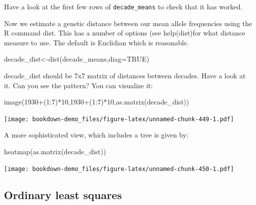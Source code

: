 \documentclass[
]{book}
\newenvironment{Shaded}{\begin{snugshade}}{\end{snugshade}}
\newcommand{\AttributeTok}[1]{\textcolor[rgb]{0.77,0.63,0.00}{#1}}
\newcommand{\ConstantTok}[1]{\textcolor[rgb]{0.00,0.00,0.00}{#1}}
\newcommand{\DecValTok}[1]{\textcolor[rgb]{0.00,0.00,0.81}{#1}}
\newcommand{\FunctionTok}[1]{\textcolor[rgb]{0.00,0.00,0.00}{#1}}
\newcommand{\NormalTok}[1]{#1}
\newcommand{\OtherTok}[1]{\textcolor[rgb]{0.56,0.35,0.01}{#1}}
\newcommand{\SpecialCharTok}[1]{\textcolor[rgb]{0.00,0.00,0.00}{#1}}
\begin{document}
Have a look at the first few rows of \texttt{decade\_means} to check that it has worked.

Now we estimate a genetic distance between our mean allele frequencies using the R command dist. This has a number of options (see help(dist)for what distance measure to use. The default is Euclidian which is reasonable.

\begin{Shaded}
\begin{Highlighting}[]
\NormalTok{decade\_dist}\OtherTok{\textless{}{-}}\FunctionTok{dist}\NormalTok{(decade\_means,}\AttributeTok{diag=}\ConstantTok{TRUE}\NormalTok{)}
\end{Highlighting}
\end{Shaded}

decade\_dist should be 7x7 matrix of distances between decades. Have a look at it. Can you
see the pattern? You can visualize it:

\begin{Shaded}
\begin{Highlighting}[]
\FunctionTok{image}\NormalTok{(}\DecValTok{1930}\SpecialCharTok{+}\NormalTok{(}\DecValTok{1}\SpecialCharTok{:}\DecValTok{7}\NormalTok{)}\SpecialCharTok{*}\DecValTok{10}\NormalTok{,}\DecValTok{1930}\SpecialCharTok{+}\NormalTok{(}\DecValTok{1}\SpecialCharTok{:}\DecValTok{7}\NormalTok{)}\SpecialCharTok{*}\DecValTok{10}\NormalTok{,}\FunctionTok{as.matrix}\NormalTok{(decade\_dist))}
\end{Highlighting}
\end{Shaded}

\texttt{[image: bookdown-demo\_files/figure-latex/unnamed-chunk-449-1.pdf]}

A more sophisticated view, which includes a tree is given by:

\begin{Shaded}
\begin{Highlighting}[]
\FunctionTok{heatmap}\NormalTok{(}\FunctionTok{as.matrix}\NormalTok{(decade\_dist))}
\end{Highlighting}
\end{Shaded}

\texttt{[image: bookdown-demo\_files/figure-latex/unnamed-chunk-450-1.pdf]}

\hypertarget{ordinary-least-squares}{%
\subsection{Ordinary least squares}\label{ordinary-least-squares}}
\end{document}
